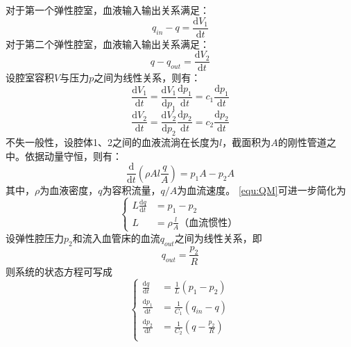 对于第一个弹性腔室，血液输入输出关系满足：
\begin{equation}
    \label{equ:QS1}
    q_{in}-q=\frac{\mathrm{d} V_{1}}{\mathrm{d} t}
\end{equation}
对于第二个弹性腔室，血液输入输出关系满足：
\begin{equation}
    \label{equ:QS2}
    q-q_{out}=\frac{\mathrm{d} V_{2}}{\mathrm{d} t}
\end{equation}
设腔室容积$V$与压力$p$之间为线性关系，则有：
\begin{equation}
    \label{equ:QSV1}
    \frac{\mathrm{d} V_{1}}{\mathrm{d} t}
    =\frac{\mathrm{d} V_{1}}{\mathrm{d} p_{1}}\frac{\mathrm{d} p_{1}}{\mathrm{d} t}
    =c_{1}\frac{\mathrm{d} p_{1}}{\mathrm{d} t}
\end{equation}
\begin{equation}
    \label{equ:QSV2}
    \frac{\mathrm{d} V_{2}}{\mathrm{d} t}
    =\frac{\mathrm{d} V_{2}}{\mathrm{d} p_{2}}\frac{\mathrm{d} p_{2}}{\mathrm{d} t}
    =c_{2}\frac{\mathrm{d} p_{2}}{\mathrm{d} t}
\end{equation}
不失一般性，设腔体1、2之间的血液流淌在长度为$l$，截面积为$A$的刚性管道之中。依据动量守恒，则有：
\begin{equation}
    \label{equ:QM}
    \frac{\mathrm{d}}{\mathrm{d} t}\left ( \rho Al\frac{q}{A} \right )=p_{1}A-p_{2}A
\end{equation}
其中，$\rho$为血液密度，$q$为容积流量，$q/A$为血流速度。
\autoref{equ:QM}可进一步简化为
\begin{equation}
    \left \{
    \begin{aligned}
        L\frac{\mathrm{d} q}{\mathrm{d} t} &= p_{1}-p_{2} \\
        L &=\rho \frac{l}{A} \text{（血流惯性）}
    \end{aligned}
    \right.
\end{equation}
设弹性腔压力$p_{2}$和流入血管床的血流$q_{out}$之间为线性关系，即
\begin{equation}
    \label{equ:pq}
    q_{out}=\frac{p_{2}}{R}
\end{equation}
则系统的状态方程可写成
\begin{equation}
    \left \{
    \begin{aligned}
        \frac{\mathrm{d} q}{\mathrm{d} t} &= \frac{1}{L}(p_{1}-p_{2}) \\
        \frac{\mathrm{d} p_{1}}{\mathrm{d} t} &= \frac{1}{C_{1}}(q_{in}-q) \\
        \frac{\mathrm{d} p_{2}}{\mathrm{d} t} &= \frac{1}{C_{2}}(q-\frac{p_{2}}{R}) \\
    \end{aligned}
    \right.
\end{equation}
